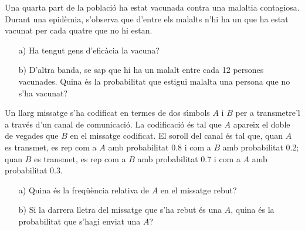 \begin{probres} {Una quarta part de la poblaci\'o ha estat vacunada contra una
malaltia contagiosa. Durant una epid\`emia, s'observa que d'entre els malalts
n'hi ha un que ha estat vacunat per cada quatre que no hi estan. \begin{itemize}
\item[a)] Ha tengut gens d'efic\`acia la vacuna? \item[b)] D'altra banda, se sap
que hi ha un malalt entre cada 12 persones vacunades. Quina \'es la probabilitat
que estigui malalta una persona que no s'ha vacunat? \end{itemize}}
\end{probres}


\begin{probres} {Un llarg missatge s'ha codificat en termes de dos s\'{\i}mbols
$A$ i $B$ per a transmetre'l a trav\'es d'un canal de comunicaci\'o. La
codificaci\'o \'es tal que $A$ apareix el doble de vegades que $B$ en el missatge
codificat. El soroll del canal \'es tal que, quan $A$ es transmet, es rep com a
$A$ amb probabilitat 0.8 i com a $B$ amb probabilitat 0.2; quan $B$ es transmet,
es rep com a $B$ amb probabilitat 0.7 i com a $A$ amb probabilitat 0.3.
\begin{itemize} \item[a)] Quina \'es la freq\"u\`encia relativa de $A$ en el
missatge rebut? \item[b)] Si la darrera lletra del missatge que s'ha rebut \'es
una $A$, quina \'es la probabilitat que s'hagi enviat una $A$? 
\end{itemize}}
\end{probres}

